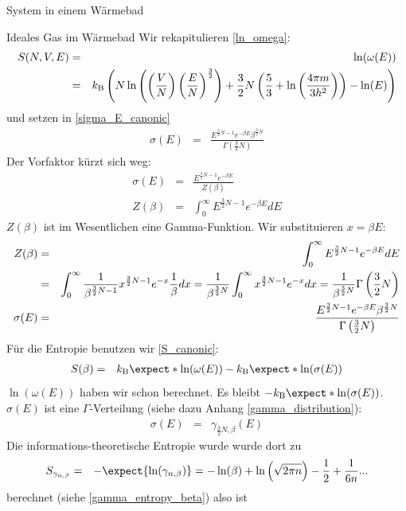 \begin{chapter}{\titlestr}
\begin{section}{System in einem Wärmebad}
\begin{subsection}{Ideales Gas im Wärmebad}
Wir rekapitulieren \ref{ln_omega}:
\begin{eqnarray*}
S(N,V,E) &=& \ln(\omega(E))\cr
&=& k_{\mathrm{B}}\left( N \ln \left( \left(\frac VN\right) \left(\frac EN \right)^{\frac 32}\right)+ {\frac 32}N\left( {\frac 53}+ \ln\left(\frac{4\pi m}{3h^2}\right)\right)-\ln(E)\right)
\end{eqnarray*}
und setzen in \ref{sigma_E_canonic}
\begin{eqnarray*}
\sigma(E)&=& \frac{E^{\frac{3}{2}N-1}e^{-\beta E}\beta^{\frac{3}{2}N}}{\Gamma\left(\frac{3}{2}N\right)}
\end{eqnarray*}
Der Vorfaktor kürzt sich weg:
\begin{eqnarray*}
\sigma(E)&=& \frac{E^{\frac{3}{2}N-1}e^{-\beta E}}{Z\left(\beta\right)}\\
Z(\beta) &=& \int_0^\infty E^{\frac{3}{2}N-1}e^{-\beta E}dE
\end{eqnarray*}
$Z(\beta)$ ist im Wesentlichen eine Gamma-Funktion. Wir substituieren $x=\beta E$:
\begin{eqnarray}
\label{ideal_canonic_sigma}
Z(\beta) &=& \int_0^\infty E^{\frac{3}{2}N-1}e^{-\beta E}dE\cr
&=& \int_0^\infty \frac{1}{\beta^{\frac{3}{2}N-1}}x^{\frac{3}{2}N-1}e^{-x}\frac{1}{\beta}dx
=\frac{1}{\beta^{\frac{3}{2}N}}\int_0^\infty x^{\frac{3}{2}N-1}e^{-x}dx = \frac{1}{\beta^{\frac{3}{2}N}}\Gamma\left(\frac{3}{2}N\right)\cr
\sigma(E)&=& \frac{E^{\frac{3}{2}N-1}e^{-\beta E}\beta^{\frac{3}{2}N}}{\Gamma\left(\frac{3}{2}N\right)}
\end{eqnarray}
Für die Entropie benutzen wir \ref{S_canonic}:
\begin{eqnarray*}
S(\beta) &=& \kb \expect*{\ln(\omega(E))}-\kb \expect*{\ln(\sigma(E))}\\
\end{eqnarray*}
$\ln(\omega(E))$ haben wir schon berechnet. Es bleibt $-\kb \expect*{\ln(\sigma(E))}$.
$\sigma(E)$ ist eine $\Gamma$-Verteilung (siehe dazu Anhang \ref{gamma_distribution}):
\begin{eqnarray*}
\sigma(E) &=& \gamma_{\frac{3}{2}N,\beta}(E)
\end{eqnarray*}
Die informations-theoretische Entropie wurde wurde dort zu
\begin{eqnarray*}
S_{\gamma_{n,\beta}}&=& -\expect{\ln(\gamma_{n,\beta})}=-\ln(\beta)+\ln\left(\sqrt{2\pi n}\right)-\frac{1}{2}+\frac{1}{6n}...
\end{eqnarray*}
berechnet (siehe \ref{gamma_entropy_beta})
also ist
\begin{eqnarray*}

\end{eqnarray*}
\end{subsection}
\end{section}
\end{chapter}
